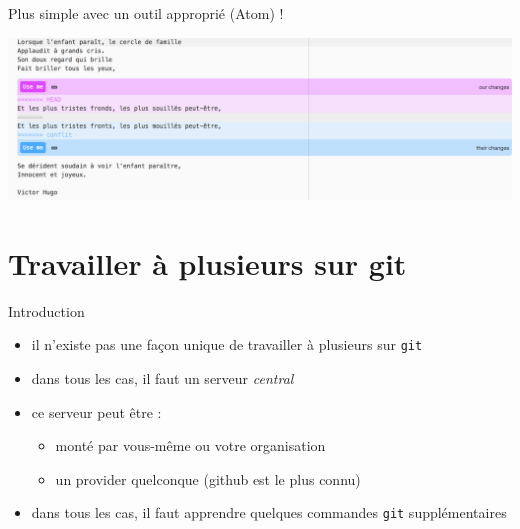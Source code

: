 \begin{frame}{%
\protect\hypertarget{plus-simple-avec-un-outil-appropriuxe9-atom}{%
Plus simple avec un outil approprié (Atom) !}}

\includegraphics[width=1\textwidth]{images/fusion.png}

\end{frame}

\hypertarget{travailler-uxe0-plusieurs-sur-git}{%
\section{Travailler à plusieurs sur
git}\label{travailler-uxe0-plusieurs-sur-git}}

\begin{frame}[fragile]{%
\protect\hypertarget{introduction}{%
Introduction}}

\begin{itemize}
\tightlist
\item
  il n’existe pas une façon unique de travailler à plusieurs sur
  \texttt{git}
\item
  dans tous les cas, il faut un serveur \emph{central}
\item
  ce serveur peut être :

  \begin{itemize}
  \tightlist
  \item
    monté par vous-même ou votre organisation
  \item
    un provider quelconque (github est le plus connu)
  \end{itemize}
\item
  dans tous les cas, il faut apprendre quelques commandes
  \texttt{git} supplémentaires
\end{itemize}

\end{frame}

